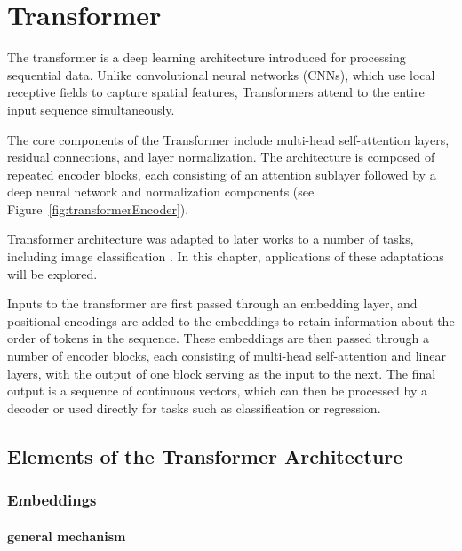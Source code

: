 \documentclass{pracalicmgr}
\begin{document}
\chapter{Transformer}

The transformer is a deep learning architecture introduced for processing sequential data\cite{Vaswani2017Attention}. Unlike convolutional neural networks (CNNs), which use local receptive fields to capture spatial features, Transformers attend to the entire input sequence simultaneously.

The core components of the Transformer include multi-head self-attention layers, residual connections, and layer normalization. The architecture is composed of repeated encoder blocks, each consisting of an attention sublayer followed by a deep neural network and normalization components (see Figure~\ref{fig:transformerEncoder}).

Transformer architecture was adapted to later works to a number of tasks, including image classification \cite{ViT}. In this chapter, applications of these adaptations will be explored.

Inputs to the transformer are first passed through an embedding layer, and positional encodings are added to the embeddings to retain information about the order of tokens in the sequence. These embeddings are then passed through a number of encoder blocks, each consisting of multi-head self-attention and linear layers, with the output of one block serving as the input to the next. The final output is a sequence of continuous vectors, which can then be processed by a decoder or used directly for tasks such as classification or regression.



\section{Elements of the Transformer Architecture}

\subsection{Embeddings}

\subsubsection{general mechanism}
\end{document}
